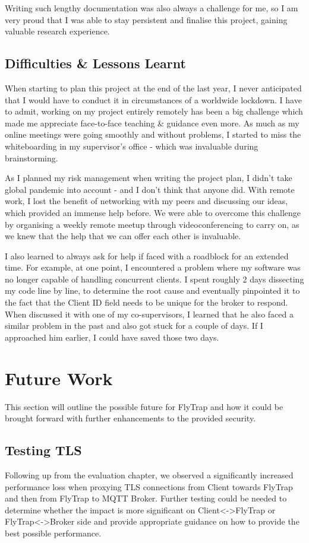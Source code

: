 Writing such lengthy documentation was also always a challenge for me, so I am very proud that I was able to stay persistent and finalise this project, gaining valuable research experience.

\subsection{Difficulties \& Lessons Learnt}
When starting to plan this project at the end of the last year, I never anticipated that I would have to conduct it in circumstances of a worldwide lockdown. I have to admit, working on my project entirely remotely has been a big challenge which made me appreciate face-to-face teaching \& guidance even more. As much as my online meetings were going smoothly and without problems, I started to miss the whiteboarding in my supervisor's office - which was invaluable during brainstorming.

As I planned my risk management when writing the project plan, I didn't take global pandemic into account - and I don't think that anyone did. With remote work, I lost the benefit of networking with my peers and discussing our ideas, which provided an immense help before. We were able to overcome this challenge by organising a weekly remote meetup through videoconferencing to carry on, as we knew that the help that we can offer each other is invaluable.

I also learned to always ask for help if faced with a roadblock for an extended time. For example, at one point, I encountered a problem where my software was no longer capable of handling concurrent clients. I spent roughly 2 days dissecting my code line by line, to determine the root cause and eventually pinpointed it to the fact that the Client ID field needs to be unique for the broker to respond. When discussed it with one of my co-supervisors, I learned that he also faced a similar problem in the past and also got stuck for a couple of days. If I approached him earlier, I could have saved those two days.

\section{Future Work}
This section will outline the possible future for FlyTrap and how it could be brought forward with further enhancements to the provided security.
\subsection{Testing TLS}
Following up from the evaluation chapter, we observed a significantly increased performance loss when proxying TLS connections from Client towards FlyTrap and then from FlyTrap to MQTT Broker. Further testing could be needed to determine whether the impact is more significant on \mbox{Client<->FlyTrap} or FlyTrap<->Broker side and provide appropriate guidance on how to provide the best possible performance.

